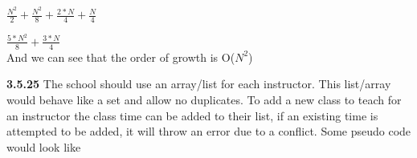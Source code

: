 \documentclass[12pt]{article}
\begin{document}
\begin{itemize}
$\frac{N^2}{2} + \frac{N^2}{8} + \frac{2*N}{4} + \frac{N}{4}$

$\frac{5*N^2}{8} + \frac{3*N}{4}$\\

And we can see that the order of growth is O($N^2$)



\textbf{3.5.25} The school should use an array/list for each instructor. This list/array would behave like a set and allow no duplicates. To add a new class to teach for an instructor the class time can be added to their list, if an existing time is attempted to be added, it will throw an error due to a conflict. Some pseudo code would look like

\noindent 


\end{itemize}
\end{document}
